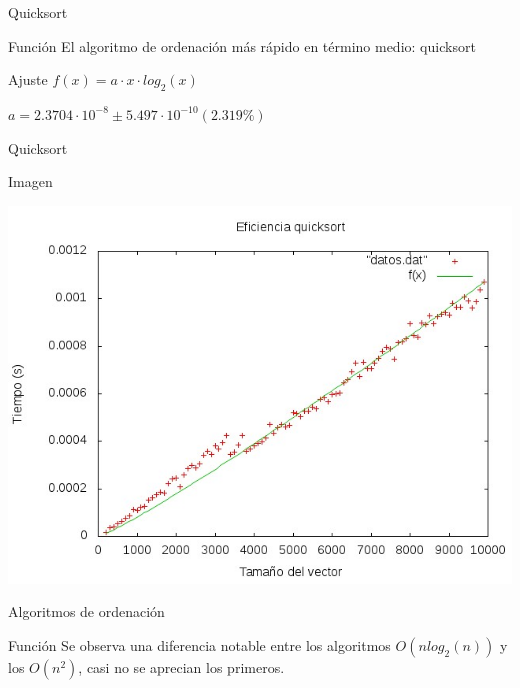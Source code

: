 \documentclass[compress]{beamer}
\begin{document}
\begin{frame}{Quicksort}
	\begin{block}{Función}
	El algoritmo de ordenación más rápido en término medio: quicksort
	\end{block}
	
	\begin{block}{Ajuste}
	$f(x) = a\cdot x\cdot log_2(x)$

	$a               = 2.3704\cdot 10^{-8}       \pm 5.497\cdot 10^{-10}    (2.319\%) $
	\end{block}
\end{frame}
\begin{frame}{Quicksort}
	\begin{alertblock}{Imagen}
	\begin{center}
	\includegraphics[scale=0.55]{../Graficas/Quicksort/quicksortO0_bruno.jpeg}					\end{center}	
	\end{alertblock}
\end{frame}


\begin{frame}{Algoritmos de ordenación}
	\begin{block}{Función}
	Se observa una diferencia notable entre los algoritmos $O(nlog_2(n))$ y los
	$O(n^2)$, casi no se aprecian los primeros.
	\end{block}
\end{frame}
\end{document}
